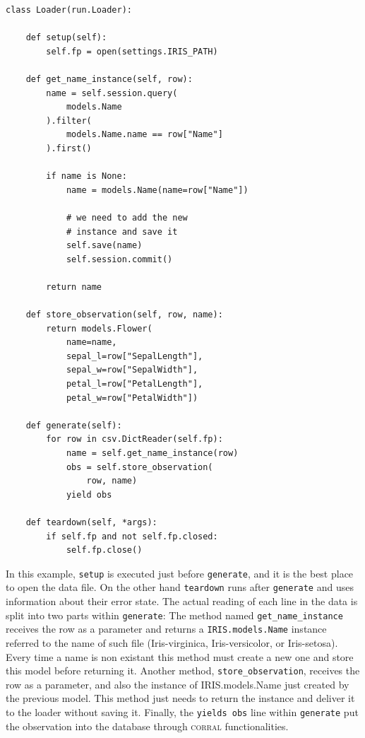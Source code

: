 \documentclass[final,5p,times,twocolumn,authoryear]{elsarticle}
\begin{document}
\begin{verbatim}
class Loader(run.Loader):

    def setup(self):
        self.fp = open(settings.IRIS_PATH)

    def get_name_instance(self, row):
        name = self.session.query(
            models.Name
        ).filter(
            models.Name.name == row["Name"]
        ).first()

        if name is None:
            name = models.Name(name=row["Name"])

            # we need to add the new
            # instance and save it
            self.save(name)
            self.session.commit()

        return name

    def store_observation(self, row, name):
        return models.Flower(
            name=name,
            sepal_l=row["SepalLength"],
            sepal_w=row["SepalWidth"],
            petal_l=row["PetalLength"],
            petal_w=row["PetalWidth"])

    def generate(self):
        for row in csv.DictReader(self.fp):
            name = self.get_name_instance(row)
            obs = self.store_observation(
                row, name)
            yield obs

    def teardown(self, *args):
        if self.fp and not self.fp.closed:
            self.fp.close()
\end{verbatim}

In this example, \verb|setup| is executed just before \verb|generate|,
and it is the best place to open the data file.
%
On the other hand \verb|teardown| runs after \verb|generate| and uses
information about their error state.
%
The actual reading of each line in the data is split into two parts
within \verb|generate|:
%
The method named \verb|get_name_instance| receives the row as a
parameter and returns a \verb|IRIS.models.Name| instance referred to
the name of such file (Iris-virginica, Iris-versicolor, or
Iris-setosa).
%
Every time a name is non existant this method must create a new one
and store this model before returning it.
%
Another method, \verb|store_observation|, receives the row as a
parameter, and also the instance of IRIS.models.Name just created by
the previous model.
%
This method just needs to return the instance and deliver it to the
loader without saving it.
%
Finally, the \verb|yields obs| line within \verb|generate| put the
observation into the database through \textsc{corral} functionalities.
\end{document}
